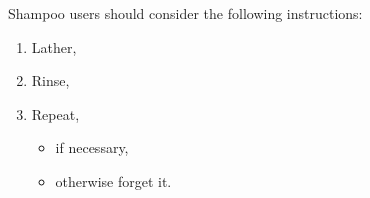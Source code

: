 \documentclass{article}
\begin{document}
\fontsize{40}{50}\selectfont 

Shampoo users should consider 
the following instructions:
\begin{enumerate}
\item Lather,
\item Rinse,
\item Repeat,
    \begin{itemize}
     \item{if necessary,}
     \item{otherwise forget it.}
    \end{itemize}
\end{enumerate}
\end{document}

